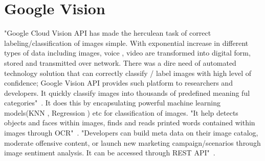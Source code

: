 \section{Google Vision}


"Google Cloud Vision API has made the herculean task of correct 
labeling/classification of images simple. With exponential increase 
in different types of data including images, voice , video are 
transformed into digital form, stored and transmitted over network. 
There was a dire need of automated technology solution that can 
correctly classify / label images with high level of confidence; 
Google Vision API provides such platform to researchers and developers. 
It quickly classify images into thousands of predefined 
meaning ful categories"~\cite{hid-sp18-523-www-google-vision}. 
It does this by encapsulating powerful machine learning 
models(KNN , Regression ) etc for classification of images. 
"It help detects objects and faces within images, finds and reads 
printed words contained within images through 
OCR"~\cite{hid-sp18-523-www-google-vision}. 
"Developers can build meta data on their image catalog, moderate 
offensive content, or launch new marketing campaign/scenarios through 
image sentiment analysis. It can be accessed 
through REST API"~\cite{hid-sp18-523-www-google-vision}.


